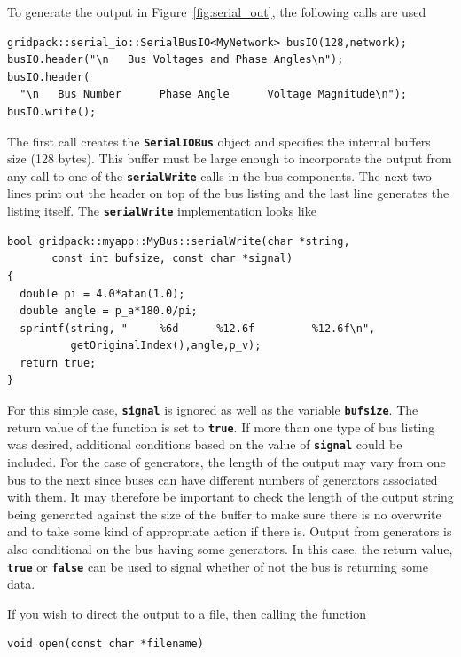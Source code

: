 To generate the output in Figure~\ref{fig:serial_out}, the following calls are used

{
\color{red}
\begin{Verbatim}[fontseries=b]
gridpack::serial_io::SerialBusIO<MyNetwork> busIO(128,network);
busIO.header("\n   Bus Voltages and Phase Angles\n");
busIO.header(
  "\n   Bus Number      Phase Angle      Voltage Magnitude\n");
busIO.write();
\end{Verbatim}
}

The first call creates the \texttt{\textbf{SerialIOBus}} object and specifies the internal buffers size (128 bytes). This buffer must be large enough to incorporate the output from any call to one of the \texttt{\textbf{serialWrite}} calls in the bus components. The next two lines print out the header on top of the bus listing and the last line generates the listing itself. The \texttt{\textbf{serialWrite}} implementation looks like

{
\color{red}
\begin{Verbatim}[fontseries=b]
bool gridpack::myapp::MyBus::serialWrite(char *string,
       const int bufsize, const char *signal)
{  
  double pi = 4.0*atan(1.0);
  double angle = p_a*180.0/pi;
  sprintf(string, "     %6d      %12.6f         %12.6f\n",
          getOriginalIndex(),angle,p_v);
  return true;
}
\end{Verbatim}
}

For this simple case, \texttt{\textbf{signal}} is ignored as well as the variable
\texttt{\textbf{bufsize}}. The return value of the function is set to
\texttt{\textbf{true}}. If more than one type of bus listing was desired,
additional conditions based on the value of \texttt{\textbf{signal}} could be
included. For the case of generators, the length of the output may vary from one
bus to the next since buses can have different numbers of generators associated
with them. It may therefore be important to check the length of the output
string being generated against the size of the buffer to make sure there is no
overwrite and to take some kind of appropriate action if there is. Output from
generators is also conditional on the bus having some generators. In this case,
the return value, \texttt{\textbf{true}} or \texttt{\textbf{false}} can be used
to signal whether of not the bus is returning some data.

If you wish to direct the output to a file, then calling the function

{
\color{red}
\begin{Verbatim}[fontseries=b]
void open(const char *filename)
\end{Verbatim}
}

